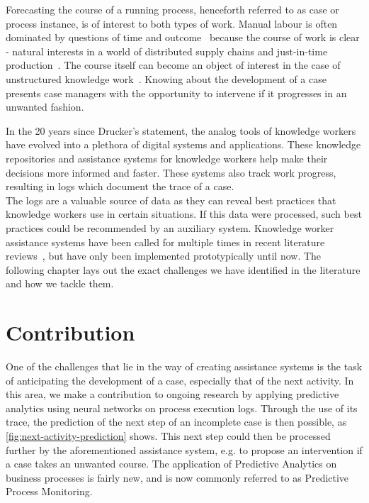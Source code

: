 Forecasting the course of a running process, henceforth referred to as case or process instance, is of interest to both types of work. Manual labour is often dominated by questions of time and outcome~\cite{rogge2013} because the course of work is clear - natural interests in a world of distributed supply chains and just-in-time production~\cite{web:economist:jit}. The course itself can become an object of interest in the case of unstructured knowledge work~\cite{francescomarino2015}. Knowing about the development of a case presents case managers with the opportunity to intervene if it progresses in an unwanted fashion.

In the 20 years since Drucker's statement, the analog tools of knowledge workers have evolved into a plethora of digital systems and applications. These knowledge repositories and assistance systems for knowledge workers help make their decisions more informed and faster. These systems also track work progress, resulting in logs which document the trace of a case.\\

The logs are a valuable source of data as they can reveal best practices that knowledge workers use in certain situations. If this data were processed, such best practices could be recommended by an auxiliary system. Knowledge worker assistance systems have been called for multiple times in recent literature reviews~\cite{hauder2014, francescomarino2018}, but have only been implemented prototypically until now. The following chapter lays out the exact challenges we have identified in the literature and how we tackle them.

\section{Contribution}\label{sec:intro:contribution}
One of the challenges that lie in the way of creating assistance systems is the task of anticipating the development of a case, especially that of the next activity. In this area, we make a contribution to ongoing research by applying predictive analytics using neural networks on process execution logs. Through the use of its trace, the prediction of the next step of an incomplete case is then possible, as \autoref{fig:next-activity-prediction} shows. This next step could then be processed further by the aforementioned assistance system, e.g. to propose an intervention if a case takes an unwanted course. The application of Predictive Analytics on business processes is fairly new, and is now commonly referred to as Predictive Process Monitoring. \\

